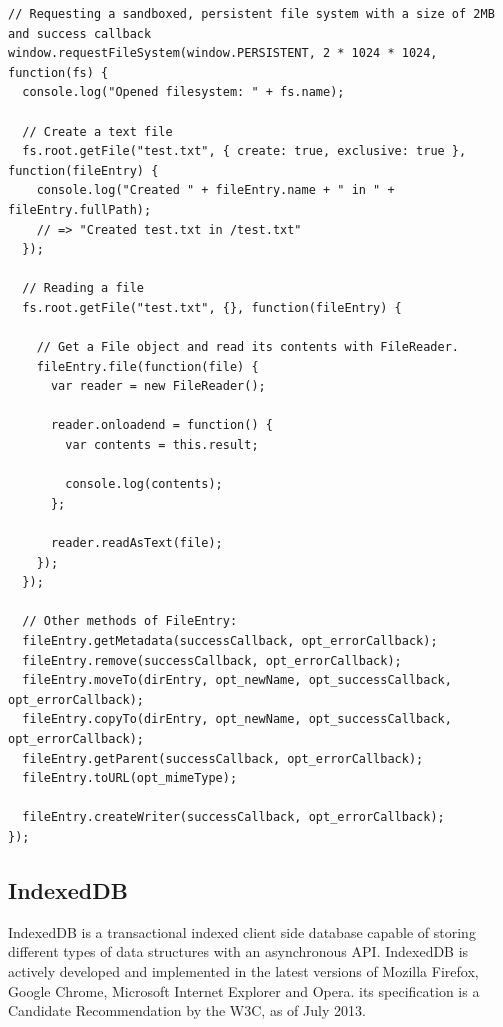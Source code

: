 \begin{Code}
\begin{lstlisting}[caption={Use of FileSystem}, label={lst:filesystem}]
// Requesting a sandboxed, persistent file system with a size of 2MB and success callback
window.requestFileSystem(window.PERSISTENT, 2 * 1024 * 1024, function(fs) {
  console.log("Opened filesystem: " + fs.name);

  // Create a text file
  fs.root.getFile("test.txt", { create: true, exclusive: true }, function(fileEntry) {
    console.log("Created " + fileEntry.name + " in " + fileEntry.fullPath);
    // => "Created test.txt in /test.txt"
  });

  // Reading a file
  fs.root.getFile("test.txt", {}, function(fileEntry) {

    // Get a File object and read its contents with FileReader.
    fileEntry.file(function(file) {
      var reader = new FileReader();

      reader.onloadend = function() {
        var contents = this.result;

        console.log(contents);
      };

      reader.readAsText(file);
    });
  });

  // Other methods of FileEntry:
  fileEntry.getMetadata(successCallback, opt_errorCallback);
  fileEntry.remove(successCallback, opt_errorCallback);
  fileEntry.moveTo(dirEntry, opt_newName, opt_successCallback, opt_errorCallback);
  fileEntry.copyTo(dirEntry, opt_newName, opt_successCallback, opt_errorCallback);
  fileEntry.getParent(successCallback, opt_errorCallback);
  fileEntry.toURL(opt_mimeType);

  fileEntry.createWriter(successCallback, opt_errorCallback);
});
\end{lstlisting}
\end{Code}

\subsection{IndexedDB}
\label{sec:indexeddb}
IndexedDB is a transactional indexed client side database capable of storing different types of data structures with an asynchronous API. IndexedDB is actively developed and implemented in the latest versions of Mozilla Firefox, Google Chrome, Microsoft Internet Explorer and Opera. its specification is a Candidate Recommendation by the W3C, as of July 2013\cite{IndexedDB:Online}.


